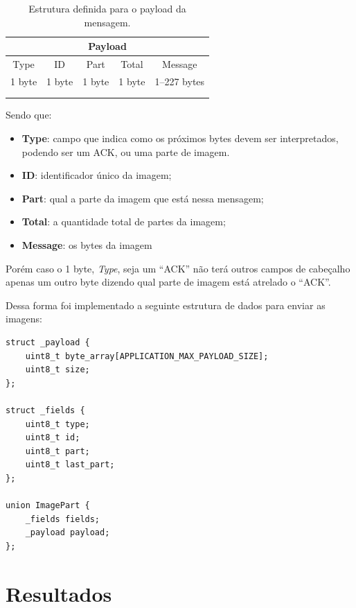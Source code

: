 \documentclass[
article,			%
12pt,				%
oneside,			%
a4paper,			%
english,			%
brazil,				%
sumario=tradicional
]{abntex2}
\begin{document}
\begin{table}[h]
\caption{Estrutura definida para o payload da mensagem.}
\centering
\begin{tabular}{cllll}
\hline
\multicolumn{5}{|c|}{Payload}    \\ \hline
\multicolumn{1}{|c|}{Type}   & \multicolumn{1}{c|}{ID}     & \multicolumn{1}{c|}{Part}   & \multicolumn{1}{c|}{Total}  & \multicolumn{1}{c|}{Message}      \\ \hline
\multicolumn{1}{|c|}{1 byte} & \multicolumn{1}{c|}{1 byte} & \multicolumn{1}{c|}{1 byte} & \multicolumn{1}{c|}{1 byte} & \multicolumn{1}{c|}{1--227 bytes} \\ \hline
\multicolumn{1}{l}{} &  &  &  &  \\
\multicolumn{1}{l}{} &  &  &  & 
\end{tabular}
\end{table}

\cleardoublepage
Sendo que:
\begin{itemize}
    \item\textbf{Type}: campo que indica como os próximos bytes devem ser interpretados, podendo ser um ACK, ou uma parte de imagem.
    \item\textbf{ID}: identificador único da imagem;
    \item\textbf{Part}: qual a parte da imagem que está nessa mensagem;
    \item\textbf{Total}: a quantidade total de partes da imagem;
    \item\textbf{Message}: os bytes da imagem
\end{itemize}

Porém caso o 1 byte, \textit{Type}, seja um ``ACK'' não terá outros campos de cabeçalho apenas um outro byte dizendo qual parte de imagem está atrelado o ``ACK''.

Dessa forma foi implementado a seguinte estrutura de dados para enviar as imagens:

\begin{lstlisting}[title=Definição da estrutura do payload]
struct _payload {
    uint8_t byte_array[APPLICATION_MAX_PAYLOAD_SIZE];
    uint8_t size;
};

struct _fields {
    uint8_t type;
    uint8_t id;
    uint8_t part;
    uint8_t last_part;
};

union ImagePart {
    _fields fields;
    _payload payload;
};
\end{lstlisting}

\section{Resultados}\label{Resultados}
\end{document}
